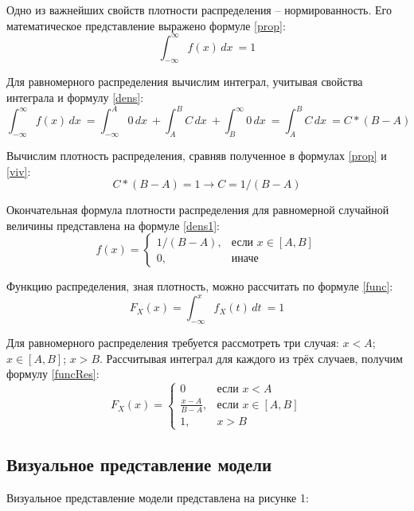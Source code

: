 Одно из важнейших свойств плотности распределения -- нормированность. Его математическое представление выражено формуле \ref{prop}:
\begin{equation}
	\label{prop}
	\int_{-\infty}^{\infty} f(x) \,dx \ = 1
\end{equation}

Для равномерного распределения вычислим интеграл, учитывая свойства интеграла и формулу \ref{dens}:
\begin{equation}
	\label{viv}
	\int_{-\infty}^{\infty} f(x) \,dx \ = \int_{-\infty}^{A} 0 \,dx \ + \int_{A}^{B} C \,dx \ + \int_{B}^{\infty} 0 \,dx \ = \int_{A}^{B} C \,dx \ = C*(B - A)
\end{equation}

Вычислим плотность распределения, сравняв полученное в формулах \ref{prop} и \ref{viv}:
\begin{equation}
	\label{vivProb}
	C*(B - A) = 1 \rightarrow C = 1 / (B - A)
\end{equation}

Окончательная формула плотности распределения для равномерной случайной величины представлена на формуле \ref{dens1}:
\begin{equation}
	\label{dens1}
	f(x)= 
	\begin{cases}
		1 / (B - A),& \text{если } x \in [A, B]\\
		0,              & \text{иначе}
	\end{cases}
\end{equation}

Функцию распределения, зная плотность, можно рассчитать по формуле \ref{func}:
\begin{equation}
	\label{func}
	F_X(x) = \int_{-\infty}^{x} f_X(t) \,dt \ = 1
\end{equation}

Для равномерного распределения требуется рассмотреть три случая: $x < A$; $x \in [A, B]$; $x > B$. Рассчитывая интеграл для каждого из трёх случаев, получим формулу \ref{funcRes}:
\begin{equation}
	\label{funcRes}
	F_X(x)= 
	\begin{cases}
		0 & \text{если } x < A\\
		\frac{x - A}{B - A},& \text{если } x \in [A, B]\\
		1,              & x > B
	\end{cases}
\end{equation}

\subsection*{Визуальное представление модели}
Визуальное представление модели представлена на рисунке 1:

